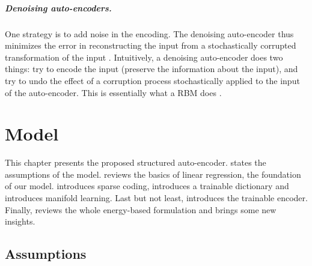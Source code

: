 \paragraph{Denoising auto-encoders.}
One strategy is to add noise in the encoding. The denoising auto-encoder thus minimizes the error in reconstructing the input from a stochastically corrupted transformation of the input \cite{bengio2008denoisingAutoencoders}. Intuitively, a denoising auto-encoder does two things: try to encode the input (preserve the information about the input), and try to undo the effect of a corruption process stochastically applied to the input of the auto-encoder. This is essentially what a \gls{RBM} does \cite{hinton2002RBM}.




\chapter{Model} \label{chap:model}

This chapter presents the proposed structured auto-encoder.  states the assumptions of the model.  reviews the basics of linear regression, the foundation of our model.  introduces sparse coding,  introduces a trainable dictionary and  introduces manifold learning. Last but not least,  introduces the trainable encoder. Finally,  reviews the whole energy-based formulation and brings some new insights.

\section{Assumptions} \label{sec:assumptions}

